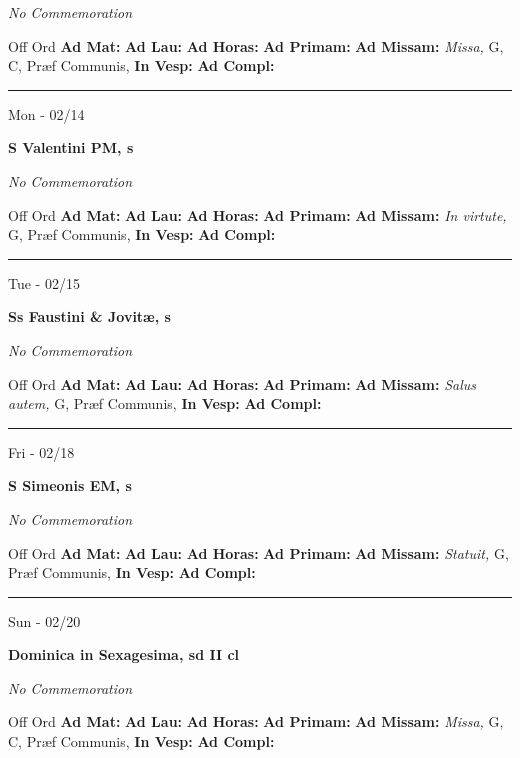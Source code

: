 \documentclass[letterpaper, 10pt]{article}
\begin{document}
\textit{No Commemoration}\begin{justify}
Off Ord
\textbf{Ad Mat: }
\textbf{Ad Lau: }
\textbf{Ad Horas: }
\textbf{Ad Primam: }
\textbf{Ad Missam:} \textit{Missa, } G, C, Præf Communis, 
\textbf{In Vesp: }
\textbf{Ad Compl: }\end{justify}



\hrule
\begin{center}
Mon - 02/14
\end{center}\textbf{ \large S Valentini PM, \textnormal{\normalsize s}}

\textit{No Commemoration}\begin{justify}
Off Ord
\textbf{Ad Mat: }
\textbf{Ad Lau: }
\textbf{Ad Horas: }
\textbf{Ad Primam: }
\textbf{Ad Missam:} \textit{In virtute, } G, Præf Communis, 
\textbf{In Vesp: }
\textbf{Ad Compl: }\end{justify}



\hrule
\begin{center}
Tue - 02/15
\end{center}\textbf{ \large Ss Faustini \& Jovitæ, \textnormal{\normalsize s}}

\textit{No Commemoration}\begin{justify}
Off Ord
\textbf{Ad Mat: }
\textbf{Ad Lau: }
\textbf{Ad Horas: }
\textbf{Ad Primam: }
\textbf{Ad Missam:} \textit{Salus autem, } G, Præf Communis, 
\textbf{In Vesp: }
\textbf{Ad Compl: }\end{justify}



\hrule
\begin{center}
Fri - 02/18
\end{center}\textbf{ \large S Simeonis EM, \textnormal{\normalsize s}}

\textit{No Commemoration}\begin{justify}
Off Ord
\textbf{Ad Mat: }
\textbf{Ad Lau: }
\textbf{Ad Horas: }
\textbf{Ad Primam: }
\textbf{Ad Missam:} \textit{Statuit, } G, Præf Communis, 
\textbf{In Vesp: }
\textbf{Ad Compl: }\end{justify}



\hrule
\begin{center}
Sun - 02/20
\end{center}\textbf{ \large Dominica in Sexagesima, \textnormal{\normalsize sd II cl}}

\textit{No Commemoration}\begin{justify}
Off Ord
\textbf{Ad Mat: }
\textbf{Ad Lau: }
\textbf{Ad Horas: }
\textbf{Ad Primam: }
\textbf{Ad Missam:} \textit{Missa, } G, C, Præf Communis, 
\textbf{In Vesp: }
\textbf{Ad Compl: }\end{justify}
\end{document}
